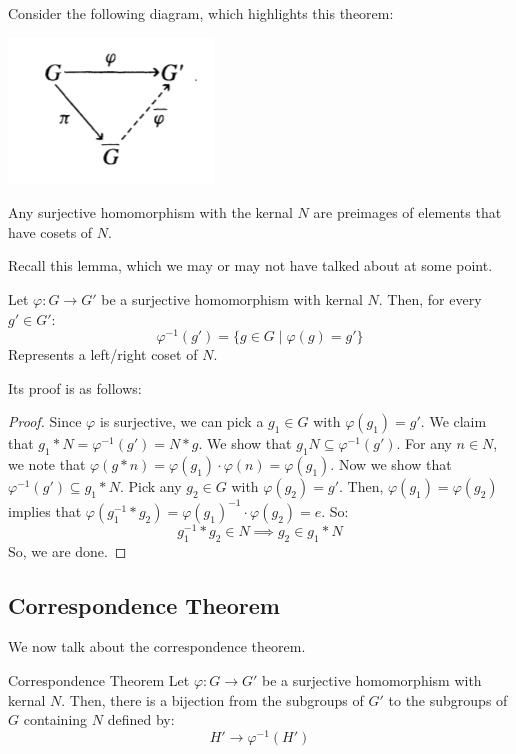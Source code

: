 \documentclass[letterpaper]{article}
\begin{document}
Consider the following diagram, which highlights this theorem: 
\begin{center}
    \includegraphics[scale=0.9]{assets/first_iso.png}
\end{center}
Any surjective homomorphism with the kernal $N$ are preimages of elements that have cosets of $N$.

\bigskip 

Recall this lemma, which we may or may not have talked about at some point. 
\begin{lemma}{}{}
    Let $\varphi: G \to G'$ be a surjective homomorphism with kernal $N$. Then, for every $g' \in G'$: 
    \[\varphi^{-1}(g') = \{g \in G \mid \varphi(g) = g'\}\]
    Represents a left/right coset of $N$. 
\end{lemma}
Its proof is as follows: 
\begin{mdframed}
    \begin{proof}
        Since $\varphi$ is surjective, we can pick a $g_1 \in G$ with $\varphi(g_1) = g'$. We claim that $g_1 * N = \varphi^{-1}(g') = N * g$. We show that $g_1 N \subseteq \varphi^{-1}(g')$. For any $n \in N$, we note that $\varphi(g * n) = \varphi(g_1) \cdot \varphi(n) = \varphi(g_1)$. Now we show that $\varphi^{-1}(g') \subseteq g_1 * N$. Pick any $g_2 \in G$ with $\varphi(g_2) = g'$. Then, $\varphi(g_1) = \varphi(g_2)$ implies that $\varphi(g_{1}^{-1} * g_2) = \varphi(g_1)^{-1} \cdot \varphi(g_2) = e$. So:
        \[g_{1}^{-1} * g_2 \in N \implies g_2 \in g_1 * N\]
        So, we are done.  
    \end{proof}
\end{mdframed}

\subsection{Correspondence Theorem}
We now talk about the correspondence theorem.
\begin{theorem}{Correspondence Theorem}{}
    Let $\varphi: G \to G'$ be a surjective homomorphism with kernal $N$. Then, there is a bijection from the subgroups of $G'$ to the subgroups of $G$ containing $N$ defined by: 
    \[H' \to \varphi^{-1}(H')\]
\end{theorem}
\end{document}
